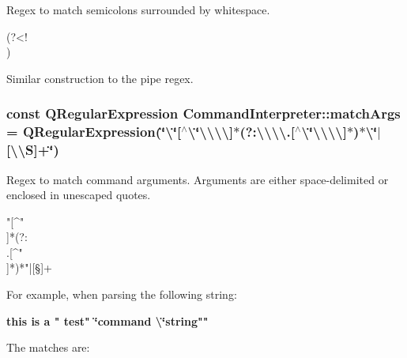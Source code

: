 Regex to match semicolons surrounded by whitespace.\par
 {\bfseries  }

\begin{DoxyVerb}\s*(?<!\\)\;\s* \end{DoxyVerb}
\par
 Similar construction to the pipe regex. \hypertarget{class_command_interpreter_a5fb8575efe24f40344f656b82b7348fa}{
\subsubsection[{match\-Args}]{\setlength{\rightskip}{0pt plus 5cm}const Q\-Regular\-Expression Command\-Interpreter\-::match\-Args = Q\-Regular\-Expression(\char`\"{}\textbackslash{}\char`\"{}\mbox{[}$^\wedge$\textbackslash{}\char`\"{}\textbackslash{}\textbackslash{}\textbackslash{}\textbackslash{}\mbox{]}$\ast$(?\-:\textbackslash{}\textbackslash{}\textbackslash{}\textbackslash{}.\mbox{[}$^\wedge$\textbackslash{}\char`\"{}\textbackslash{}\textbackslash{}\textbackslash{}\textbackslash{}\mbox{]}$\ast$)$\ast$\textbackslash{}\char`\"{}$|$\mbox{[}\textbackslash{}\textbackslash{}S\mbox{]}+\char`\"{})\hspace{0.3cm}{\ttfamily [static]}}}\label{class_command_interpreter_a5fb8575efe24f40344f656b82b7348fa}


Regex to match command arguments. Arguments are either space-\/delimited or enclosed in unescaped quotes.\par
 {\bfseries  }

\begin{DoxyVerb}"[^"\\]*(?:\\.[^"\\]*)*"|[\S]+ \end{DoxyVerb}
\par
 For example, when parsing the following string\-:\par
 {\bfseries this is a " test" \char`\"{}command \textbackslash{}\char`\"{}string""}\par
 The matches are\-:\par
 
